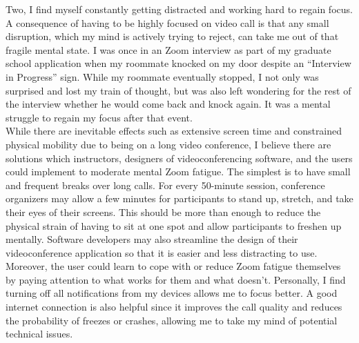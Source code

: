 \documentclass[12pt]{article}
\begin{document}
Two, I find myself constantly getting distracted and working hard to regain focus. A consequence of having to be highly focused on video call is that any small disruption, which my mind is actively trying to reject, can take me out of that fragile mental state. I was once in an Zoom interview as part of my graduate school application when my roommate knocked on my door despite an ``Interview in Progress'' sign. While my roommate eventually stopped, I not only was surprised and lost my train of thought, but was also left wondering for the rest of the interview whether he would come back and knock again. It was a mental struggle to regain my focus after that event. \\








While there are inevitable effects such as extensive screen time and constrained physical mobility due to being on a long video conference, I believe there are solutions which instructors, designers of videoconferencing software, and the users could implement to moderate mental Zoom fatigue. The simplest is to have small and frequent breaks over long calls. For every 50-minute session, conference organizers may allow a few minutes for participants to stand up, stretch, and take their eyes of their screens. This should be more than enough to reduce the physical strain of having to sit at one spot and allow participants to freshen up mentally. Software developers may also streamline the design of their videoconference application so that it is easier and less distracting to use. Moreover, the user could learn to cope with or reduce Zoom fatigue themselves by paying attention to what works for them and what doesn't. Personally, I find turning off all notifications from my devices allows me to focus better. A good internet connection is also helpful since it improves the call quality and reduces the probability of freezes or crashes, allowing me to take my mind of potential technical issues.  
















	
	
	
	
	
\end{document}
